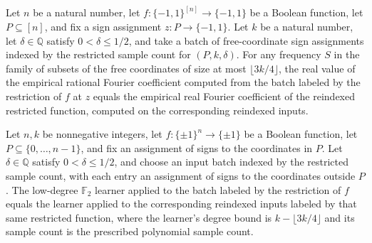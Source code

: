 \begin{theorem}
\label{FABL.lowDegreeJuntaCoefficientEstimate_cast_ideal}
\leanok
{}
Let $n$ be a natural number, let $f:\{-1,1\}^{[n]}\to\{-1,1\}$ be a Boolean function,
let $P\subseteq[n]$, and fix a sign assignment $z:P\to\{-1,1\}$. Let $k$ be a natural
number, let $\delta\in\mathbb{Q}$ satisfy $0<\delta\leq1/2$, and take a batch of
free-coordinate sign assignments indexed by the restricted sample count for
$(P,k,\delta)$. For any frequency $S$ in the family of subsets of the free coordinates
of size at most $\lfloor3k/4\rfloor$, the real value of the empirical rational Fourier
coefficient computed from the batch labeled by the restriction of $f$ at $z$ equals the
empirical real Fourier coefficient of the reindexed restricted function, computed on the
corresponding reindexed inputs.
\end{theorem}

\begin{theorem}
\label{FABL.lowDegreeJuntaPolynomialHypothesis_ideal}
\leanok
{}
Let $n,k$ be nonnegative integers, let $f:\{\pm1\}^n\to\{\pm1\}$ be a Boolean function,
let $P\subseteq\{0,\ldots,n-1\}$, and fix an assignment of signs to the coordinates in
$P$. Let $\delta\in\mathbb{Q}$ satisfy $0<\delta\le 1/2$, and choose an input batch
indexed by the restricted sample count, with each entry an assignment of signs to the
coordinates outside $P$. The low-degree $\mathbb{F}_2$ learner applied to the batch
labeled by the restriction of $f$ equals the learner applied to the corresponding
reindexed inputs labeled by that same restricted function, where the learner's degree
bound is $k-\lfloor 3k/4\rfloor$ and its sample count is the prescribed polynomial
sample count.
\end{theorem}

